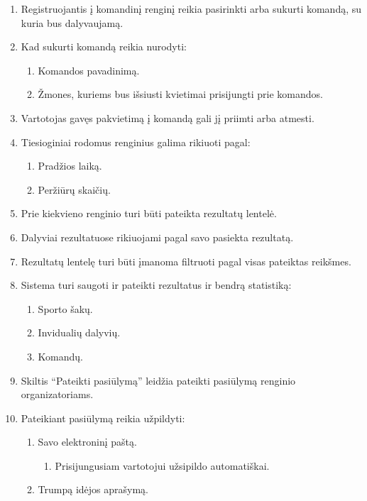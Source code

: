 \documentclass{VUMIFPSkursinis}
\begin{document}
\begin{enumerate}[label=\textbf{FR\arabic*}]
				\item Registruojantis į komandinį renginį reikia pasirinkti arba sukurti komandą, su kuria bus dalyvaujamą.
				\item Kad sukurti komandą reikia nurodyti:
					\begin{enumerate}[label*=\textbf{.\arabic*}]
						\item Komandos pavadinimą.
						\item Žmones, kuriems bus išsiusti kvietimai prisijungti prie komandos.
					\end{enumerate}
				\item Vartotojas gavęs pakvietimą į komandą gali jį priimti arba atmesti.
				\item Tiesioginiai rodomus renginius galima rikiuoti pagal:
					\begin{enumerate}[label*=\textbf{.\arabic*}]
						\item Pradžios laiką.
						\item Peržiūrų skaičių.
					\end{enumerate}
				\item Prie kiekvieno renginio turi būti pateikta rezultatų lentelė.
				\item Dalyviai rezultatuose rikiuojami pagal savo pasiekta rezultatą.
				\item Rezultatų lentelę turi būti įmanoma filtruoti pagal visas pateiktas reikšmes.
                \item Sistema turi saugoti ir pateikti rezultatus ir bendrą statistiką:
					\begin{enumerate}[label*=\textbf{.\arabic*}]
						\item Sporto šakų.
						\item Invidualių dalyvių.
						\item Komandų.
					\end{enumerate}
				\item Skiltis “Pateikti pasiūlymą” leidžia pateikti pasiūlymą renginio organizatoriams.
				\item Pateikiant pasiūlymą reikia užpildyti:
					\begin{enumerate}[label*=\textbf{.\arabic*}]
						\item Savo elektroninį paštą.
						    \begin{enumerate}[label*=\textbf{.\arabic*}]
						        \item Prisijungusiam vartotojui užsipildo automatiškai.
						    \end{enumerate}
						\item Trumpą idėjos aprašymą.

\end{enumerate}
\end{enumerate}
\end{document}
